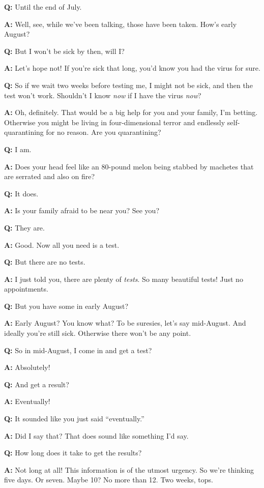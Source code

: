 \textbf{Q:} Until the end of July.

\textbf{A:} Well, see, while we've been talking, those have been taken.
How's early August?

\textbf{Q:} But I won't be sick by then, will I?

\textbf{A:} Let's hope not! If you're sick that long, you'd know you had
the virus for sure.

\textbf{Q:} So if we wait two weeks before testing me, I might not be
sick, and then the test won't work. Shouldn't I know \emph{now} if I
have the virus \emph{now}?

\textbf{A:} Oh, definitely. That would be a big help for you and your
family, I'm betting. Otherwise you might be living in four-dimensional
terror and endlessly self-quarantining for no reason. Are you
quarantining?

\textbf{Q:} I am.

\textbf{A:} Does your head feel like an 80-pound melon being stabbed by
machetes that are serrated and also on fire?

\textbf{Q:} It does.

\textbf{A:} Is your family afraid to be near you? See you?

\textbf{Q:} They are.

\textbf{A:} Good. Now all you need is a test.

\textbf{Q:} But there are no tests.

\textbf{A:} I just told you, there are plenty of \emph{tests}. So many
beautiful tests! Just no appointments.

\textbf{Q:} But you have some in early August?

\textbf{A:} Early August? You know what? To be suresies, let's say
mid-August. And ideally you're still sick. Otherwise there won't be any
point.

\textbf{Q:} So in mid-August, I come in and get a test?

\textbf{A:} Absolutely!

\textbf{Q:} And get a result?

\textbf{A:} Eventually!

\textbf{Q:} It sounded like you just said ``eventually.''

\textbf{A:} Did I say that? That does sound like something I'd say.

\textbf{Q:} How long does it take to get the results?

\textbf{A:} Not long at all! This information is of the utmost urgency.
So we're thinking five days. Or seven. Maybe 10? No more than 12. Two
weeks, tops.

